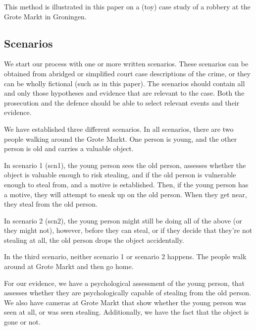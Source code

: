 \documentclass[11pt]{article}
\begin{document}
This method is illustrated in this paper on a (toy) case study of a robbery at the Grote Markt in Groningen.


\subsection{Scenarios}

We start our process with one or more written scenarios. These scenarios can be obtained from abridged or simplified court case descriptions of the crime, or they can be wholly fictional (such as in this paper). The scenarios should contain all and only those hypotheses and evidence that are relevant to the case. Both the prosecution and the defence should be able to select relevant events and their evidence. 

We have established three different scenarios. In all scenarios, there are two people walking around the Grote Markt. One person is young, and the other person is old and carries a valuable object. 

In scenario 1 (scn1), the young person sees the old person, assesses whether the object is valuable enough to risk stealing, and if the old person is vulnerable enough to steal from, and a motive is established. Then, if the young person has a motive, they will attempt to sneak up on the old person. When they get near, they steal from the old person.

In scenario 2 (scn2), the young person might still be doing all of the above (or they might not), however, before they can steal, or if they decide that they're not stealing at all, the old person drops the object accidentally.

In the third scenario, neither scenario 1 or scenario 2 happens. The people walk around at Grote Markt and then go home.

For our evidence, we have a psychological assessment of the young person, that assesses whether they are psychologically capable of stealing from the old person. We also have cameras at Grote Markt that show whether the young person was seen at all, or was seen stealing. Additionally, we have the fact that the object is gone or not.
\end{document}
